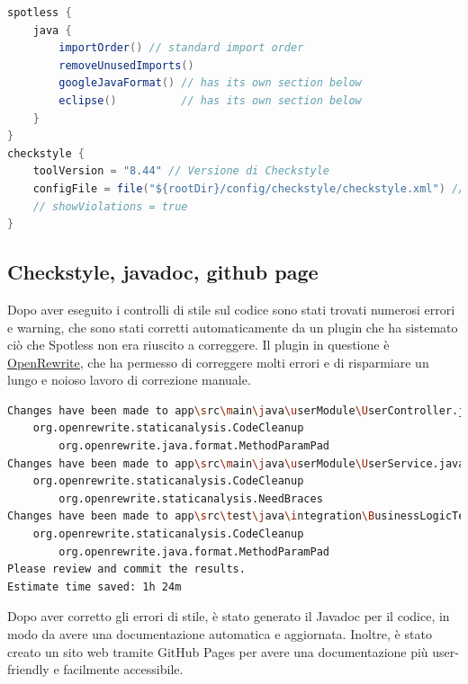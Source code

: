 \begin{lstlisting}[language=Java, caption={Code quality}, label=list:gradle_codequality]
spotless {
    java {
        importOrder() // standard import order
        removeUnusedImports()
        googleJavaFormat() // has its own section below
        eclipse()          // has its own section below
    }
}
checkstyle {
    toolVersion = "8.44" // Versione di Checkstyle
    configFile = file("${rootDir}/config/checkstyle/checkstyle.xml") // Configurazione di Checkstyle
    // showViolations = true
}
\end{lstlisting}


\subsection{Checkstyle, javadoc, github page }

Dopo aver eseguito i controlli di stile sul codice sono stati trovati numerosi errori e warning, che sono stati corretti automaticamente da un plugin che ha sistemato ciò che Spotless non era riuscito a correggere. Il plugin in questione è \href{https://github.com/openrewrite/rewrite}{\underline{OpenRewrite}}, che ha permesso di correggere molti errori e di risparmiare un lungo e noioso lavoro di correzione manuale.

\begin{lstlisting}[language=Bash, caption={Output di OpenRewrite}, label=list:openrewrite]
Changes have been made to app\src\main\java\userModule\UserController.java by:
    org.openrewrite.staticanalysis.CodeCleanup
        org.openrewrite.java.format.MethodParamPad
Changes have been made to app\src\main\java\userModule\UserService.java by:
    org.openrewrite.staticanalysis.CodeCleanup
        org.openrewrite.staticanalysis.NeedBraces
Changes have been made to app\src\test\java\integration\BusinessLogicTestIntegration.java by:
    org.openrewrite.staticanalysis.CodeCleanup
        org.openrewrite.java.format.MethodParamPad
Please review and commit the results.
Estimate time saved: 1h 24m 
\end{lstlisting}

Dopo aver corretto gli errori di stile, è stato generato il Javadoc per il codice, in modo da avere una documentazione automatica e aggiornata. Inoltre, è stato creato un sito web tramite GitHub Pages per avere una documentazione più user-friendly e facilmente accessibile. 

